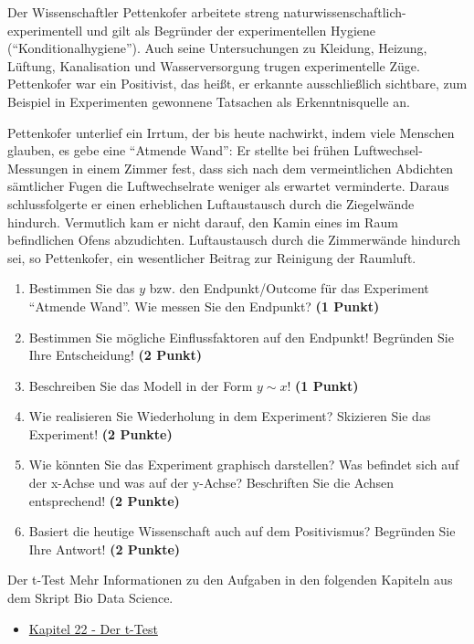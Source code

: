\documentclass[a4paper, 10pt]{scrartcl}\usepackage[]{graphicx}\usepackage[]{xcolor}
\begin{document}
Der Wissenschaftler Pettenkofer arbeitete streng naturwissenschaftlich-experimentell und gilt
als Begr{\"u}nder der experimentellen Hygiene (``Konditionalhygiene''). Auch
seine Untersuchungen zu Kleidung, Heizung, L{\"u}ftung, Kanalisation und
Wasserversorgung trugen experimentelle Z{\"u}ge. Pettenkofer war ein Positivist, das hei{\ss}t, er erkannte ausschlie{\ss}lich
sichtbare, zum Beispiel in Experimenten gewonnene Tatsachen als
Erkenntnisquelle an.

\begin{shaded}
  Pettenkofer unterlief ein Irrtum, der bis heute
  nachwirkt, indem viele Menschen glauben, es gebe eine ``Atmende Wand'':
  Er stellte bei fr{\"u}hen Luftwechsel-Messungen in einem Zimmer fest, dass
  sich nach dem vermeintlichen Abdichten s{\"a}mtlicher Fugen die
  Luftwechselrate weniger als erwartet verminderte. Daraus schlussfolgerte
  er einen erheblichen Luftaustausch durch die Ziegelw{\"a}nde
  hindurch. Vermutlich kam er nicht darauf, den Kamin eines im Raum
  befindlichen Ofens abzudichten. Luftaustausch durch die Zimmerw{\"a}nde
  hindurch sei, so Pettenkofer, ein wesentlicher Beitrag zur Reinigung der
  Raumluft.
\end{shaded}

\begin{enumerate}
\item Bestimmen Sie das $y$ bzw. den Endpunkt/Outcome f{\"u}r das Experiment ``Atmende Wand''. Wie
  messen Sie den Endpunkt? \textbf{(1 Punkt)}
\item Bestimmen Sie m{\"o}gliche Einflussfaktoren auf den Endpunkt! Begründen Sie Ihre Entscheidung! \textbf{(2 Punkt)}
\item Beschreiben Sie das Modell in der Form $y \sim x$! \textbf{(1 Punkt)}
\item Wie realisieren Sie Wiederholung in
  dem Experiment? Skizieren Sie das Experiment! \textbf{(2 Punkte)}
\item Wie k{\"o}nnten Sie das Experiment graphisch darstellen? Was befindet
  sich auf der x-Achse und was auf der y-Achse? Beschriften Sie die Achsen entsprechend!
  \textbf{(2 Punkte)}
\item Basiert die heutige Wissenschaft auch auf dem Positivismus? Begründen Sie Ihre Antwort! \textbf{(2 Punkte)}
\end{enumerate}
 
\clearpage
\begin{graybox}{Der t-Test}
Mehr Informationen zu den Aufgaben in den folgenden Kapiteln aus dem Skript Bio Data Science.
  \begin{itemize}
  \item \href{https://jkruppa.github.io/stat-tests-ttest.html}{Kapitel 22 - Der t-Test}
  \end{itemize}
\end{graybox}
\end{document}
